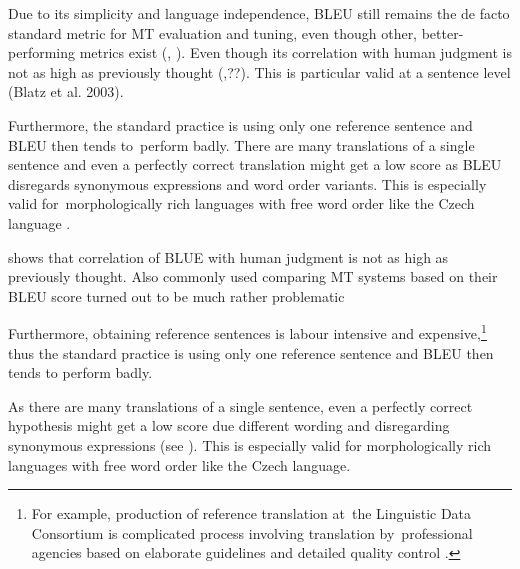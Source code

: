 Due to its simplicity and language independence, BLEU still remains the de facto standard metric for MT evaluation and tuning, even though other, better-performing metrics exist (\cite{wmt13-metrics}, \cite{wmt14}).
Even though its correlation with human judgment is not as high as previously thought (\cite{callison2006re},\cite{koehn-monz:2006:WMT}??). 
This is particular valid at a sentence level (Blatz et al. 2003).

Furthermore, the standard practice is using only one reference sentence and BLEU  then tends to~perform badly. 
There are many translations of a single sentence and even a perfectly correct translation might get a low score as BLEU disregards synonymous expressions and word order variants.
This is especially valid for~morphologically rich languages with free word order like the Czech language \cite{bojar-tackling-sparse-data}.



\cite{callison2006re} shows that correlation of BLUE with human judgment is not as high as previously thought. 
Also commonly used comparing MT systems based on their BLEU score turned out to be much rather problematic \cite{post-2018-call}

Furthermore, obtaining reference sentences is labour intensive and expensive,\footnote{For example, production of reference translation at~the Linguistic Data Consortium is complicated process involving translation by~professional agencies based on elaborate guidelines and detailed quality control \cite{strassel}.} thus the standard practice is using only one reference sentence and BLEU then tends to perform badly. 

As there are many translations of a single sentence, even a perfectly correct hypothesis might get a low score due different wording and disregarding synonymous expressions (see ). 
This is especially valid for morphologically rich languages with free word order like the Czech language. \cite{bojar-tackling-sparse-data}





